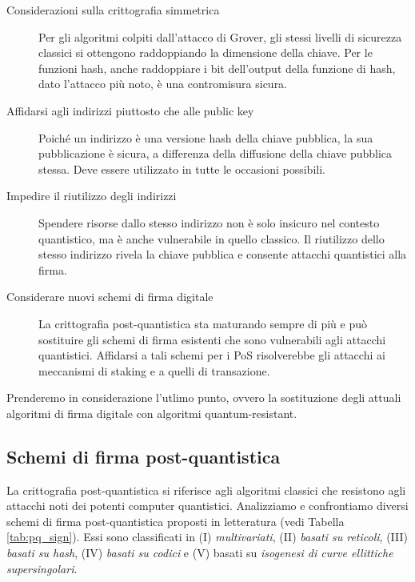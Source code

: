 \begin{description}
  \item [Considerazioni sulla crittografia simmetrica] Per gli algoritmi colpiti dall'attacco di Grover, gli stessi livelli di sicurezza classici si ottengono raddoppiando la dimensione della chiave. Per le funzioni hash, anche raddoppiare i bit dell'output della funzione di hash, dato l'attacco più noto, è una contromisura sicura.
  \item [Affidarsi agli indirizzi piuttosto che alle public key] Poiché un indirizzo è una versione hash della chiave pubblica, la sua pubblicazione è sicura, a differenza della diffusione della chiave pubblica stessa. Deve essere utilizzato in tutte le occasioni possibili.
  \item [Impedire il riutilizzo degli indirizzi] Spendere risorse dallo stesso indirizzo non è solo insicuro nel contesto quantistico, ma è anche vulnerabile in quello classico. Il riutilizzo dello stesso indirizzo rivela la chiave pubblica e consente attacchi quantistici alla firma.
  \item [Considerare nuovi schemi di firma digitale] La crittografia post-quantistica sta maturando sempre di più e può sostituire gli schemi di firma esistenti che sono vulnerabili agli attacchi quantistici. Affidarsi a tali schemi per i PoS risolverebbe gli attacchi ai meccanismi di staking e a quelli di transazione.
\end{description}

Prenderemo in considerazione l'utlimo punto, ovvero la sostituzione degli attuali algoritmi di firma digitale con algoritmi quantum-resistant.

\subsection{Schemi di firma post-quantistica}
La crittografia post-quantistica si riferisce agli algoritmi classici che resistono agli attacchi noti dei potenti computer quantistici. Analizziamo e confrontiamo diversi schemi di firma post-quantistica proposti in letteratura (vedi Tabella \ref{tab:pq_sign}). Essi sono classificati in (I) \textit{multivariati}, (II) \textit{basati su reticoli}, (III) \textit{basati su hash}, (IV) \textit{basati su codici} e (V) basati su \textit{isogenesi di curve ellittiche supersingolari}.

